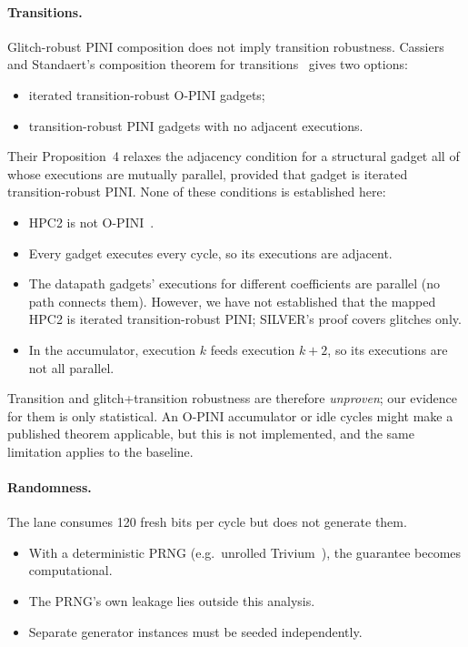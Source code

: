 \paragraph{Transitions.} Glitch-robust PINI composition does not imply transition robustness. Cassiers and Standaert's composition theorem for transitions~\cite[Theorem~2, Corollary~2]{cassiers2021trans} gives two options:
\begin{itemize}
  \item iterated transition-robust O-PINI gadgets;
  \item transition-robust PINI gadgets with no adjacent executions.
\end{itemize}
Their Proposition~4 relaxes the adjacency condition for a structural gadget all of whose executions are mutually parallel, provided that gadget is iterated transition-robust PINI. None of these conditions is established here:
\begin{itemize}
  \item HPC2 is not O-PINI~\cite{cassiers2021trans}.
  \item Every gadget executes every cycle, so its executions are adjacent.
  \item The datapath gadgets' executions for different coefficients are parallel (no path connects them). However, we have not established that the mapped HPC2 is iterated transition-robust PINI; SILVER's proof covers glitches only.
  \item In the accumulator, execution $k$ feeds execution $k + 2$, so its executions are not all parallel.
\end{itemize}
Transition and glitch+transition robustness are therefore \emph{unproven}; our evidence for them is only statistical. An O-PINI accumulator or idle cycles might make a published theorem applicable, but this is not implemented, and the same limitation applies to the baseline.

\paragraph{Randomness.} The lane consumes 120 fresh bits per cycle but does not generate them.
\begin{itemize}
  \item With a deterministic PRNG (e.g.\ unrolled Trivium~\cite{cassiers2024rng}), the guarantee becomes computational.
  \item The PRNG's own leakage lies outside this analysis.
  \item Separate generator instances must be seeded independently.
\end{itemize}

